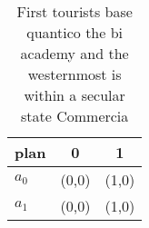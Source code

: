 \documentclass[a4paper]{article}
\begin{document}
\begin{table}
\begin{adjustbox}{width=1\columnwidth}
\begin{tabular}{|l|l|l|}
\hline
\textbf{plan} & \multicolumn{1}{c|}{\textbf{0}} & \multicolumn{1}{c|}{\textbf{1}} \\ \hline
\textbf{$a_0$}  & (0,0) & (1,0) \\ \hline
\textbf{$a_1$}  & (0,0) & (1,0) \\ \hline
\end{tabular}
\end{adjustbox}
\caption{First tourists base quantico the bi academy and the westernmost is within a secular state Commercia
}
\end{table}
\end{document}
